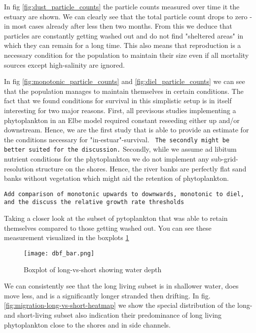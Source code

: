 In fig \ref{fig:dust_particle_counts} the particle counts measured over time it the estuary are shown.
We can clearly see that the total particle count drops to zero - in most cases already after less then two months.
From this we deduce that particles are constantly getting washed out and do not find "sheltered areas" 
in which they can remain for a long time.
This also means that reproduction is a necessary condition for the population to maintain their size 
even if all mortality sources except high-salinity are ignored.

In fig \ref{fig:monotonic_particle_counts} and \ref{fig:diel_particle_counts} we can see 
that the population manages to maintain themselves in certain conditions.
The fact that we found conditions for survival in this simplistic setup is in itself interesting for two major reasons.
First, all previsous studies implementing a phytoplankton in an Elbe model required constant reseeding either up and/or downstream.
Hence, we are the first study that is able to provide an estimate for the conditions necessary for "in-estuar"-survival.
\texttt{ The secondly might be better suited for the discussion.}
Secondly, while we assume ad libitum nutrient conditions for the phytoplankton we do not implement any sub-grid-resolution structure on the shores.
Hence, the river banks are perfectly flat sand banks without vegetation which might aid the retention of phytoplankton.

\texttt{Add comparison of monotonic upwards to downwards, monotonic to diel, and the discuss the relative growth rate thresholds}

Taking a closer look at the subset of pytoplankton that was able to retain themselves compared to those getting washed out.
You can see these measurement visualized in the boxplots \ref{fig:migration-long-vs-short}

\begin{figure}
    \texttt{[image: dbf\_bar.png]}
    \caption[]{Boxplot of long-vs-short showing water depth}
    \label{fig:migration-long-vs-short}
\end{figure}

We can consistently see that the long living subset is in shallower water, does move less, and is a significantly longer stranded then drifting.
In fig. \ref{fig:migration-long-vs-short-heatmap} we show the special distribution of the long- and short-living subset
 also indication their predominance of long living phytoplankton close to the shores and in side channels.

